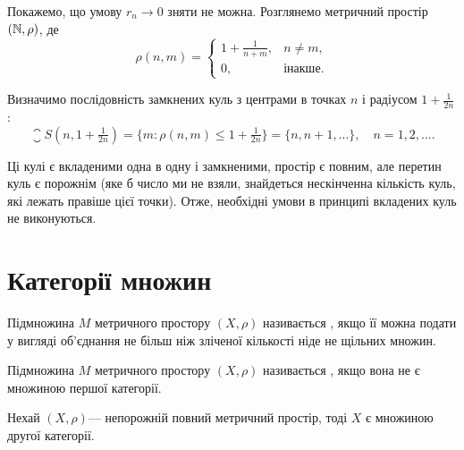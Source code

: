 \begin{remark}
Покажемо, що умову $r_n \to 0$ зняти не
можна. Розглянемо метричний простір $(\mathbb{N}, \rho)$, де
\begin{equation*}
    \rho(n, m) = \begin{cases}
        1 + \frac{1}{n + m}, & n \ne m, \\
        0, & \text{інакше}.
    \end{cases}
\end{equation*}

Визначимо послідовність замкнених куль з центрами в
точках $n$ і радіусом $1 + \frac{1}{2 n}$:
\begin{equation*}
    \closure S (n, 1 + \tfrac{1}{2n}) =
    \{ m: \rho(n, m) \le 1 + \tfrac{1}{2n} \} =
    \{n, n + 1, \dots\}, \quad n = 1, 2, \dots.
\end{equation*}

Ці кулі є вкладеними одна в одну і замкненими, простір є
повним, але перетин куль є порожнім (яке б число ми не
взяли, знайдеться нескінченна кількість куль, які лежать
правіше цієї точки). Отже, необхідні умови в принципі
вкладених куль не виконуються.
\end{remark}

\section{Категорії множин}

\begin{definition}
Підмножина $M$ метричного простору $(X, \rho)$
називається , якщо її
можна подати у вигляді об’єднання не більш ніж зліченої
кількості ніде не щільних множин.
\end{definition}

\begin{definition}
Підмножина $M$ метричного простору $(X, \rho)$
називається , якщо вона не є
множиною першої категорії.
\end{definition}

\begin{theorem}
 Нехай
$(X, \rho)$--- непорожній повний метричний простір, тоді $X$
є множиною другої категорії.
\end{theorem}

